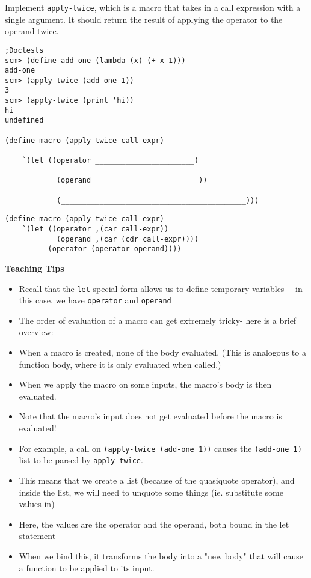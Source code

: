 \begin{blocksection}

\question Implement \texttt{apply-twice}, which is a macro that takes in a call expression with
a single argument. It should return the result of applying the operator to the operand twice.

\begin{lstlisting}
;Doctests
scm> (define add-one (lambda (x) (+ x 1)))
add-one
scm> (apply-twice (add-one 1))
3
scm> (apply-twice (print 'hi))
hi
undefined

(define-macro (apply-twice call-expr)

    `(let ((operator _______________________)

            (operand  _______________________))

            (___________________________________________)))
\end{lstlisting}

\begin{solution}[0.5in]
\begin{lstlisting}
(define-macro (apply-twice call-expr)
    `(let ((operator ,(car call-expr))
            (operand ,(car (cdr call-expr))))
          (operator (operator operand))))
\end{lstlisting}
\end{solution}
\end{blocksection}

\begin{guide}
\begin{blocksection}
\textbf{Teaching Tips}
\begin{itemize}
  \item Recall that the \lstinline{let} special form allows us to define temporary variables— in this case,
    we have \lstinline{operator} and \lstinline{operand}
  \item The order of evaluation of a macro can get extremely tricky- here is a brief overview:
  \item When a macro is created, none of the body evaluated. (This is analogous to a
  function body, where it is only evaluated when called.)
  \item When we apply the macro on some inputs, the macro’s body is then evaluated.
  \item Note that the macro’s input does not get evaluated before the macro is evaluated!
  \item For example, a call on \lstinline{(apply-twice (add-one 1))} causes the \lstinline{(add-one 1)} list to be
  parsed by \lstinline{apply-twice}.
  \item This means that we create a list (because of the quasiquote
  operator), and inside the list, we will need to unquote some things (ie. substitute some
  values in)
  \item Here, the values are the operator and the operand, both bound in the let
  statement
  \item When we bind this, it transforms the body into a "new body" that will cause a
  function to be applied to its input.
\end{itemize}

\end{blocksection}
\end{guide}
